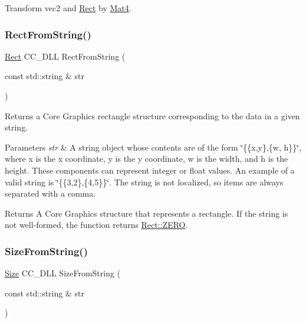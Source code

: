 Transform vec2 and \hyperlink{classRect}{Rect} by \hyperlink{classMat4}{Mat4}. \mbox{\label{group__base_gada35ca7274b8913c2341dbe8c78300bb}} 
\subsubsection{\texorpdfstring{Rect\+From\+String()}{RectFromString()}}
{\footnotesize\ttfamily \hyperlink{classRect}{Rect} C\+C\+\_\+\+D\+LL Rect\+From\+String (\begin{DoxyParamCaption}\item[{const std\+::string \&}]{str }\end{DoxyParamCaption})}



Returns a Core Graphics rectangle structure corresponding to the data in a given string. 


\begin{DoxyParams}{Parameters}
{\em str} & A string object whose contents are of the form \char`\"{}\{\{x,y\},\{w, h\}\}\char`\"{}, where x is the x coordinate, y is the y coordinate, w is the width, and h is the height. These components can represent integer or float values. An example of a valid string is \char`\"{}\{\{3,2\},\{4,5\}\}\char`\"{}. The string is not localized, so items are always separated with a comma. \\
\hline
\end{DoxyParams}
\begin{DoxyReturn}{Returns}
A Core Graphics structure that represents a rectangle. If the string is not well-\/formed, the function returns \hyperlink{classRect_a590be46e60027b2ca0f62a457f91a83e}{Rect\+::\+Z\+E\+RO}. 
\end{DoxyReturn}
\mbox{\label{group__base_gaac2ed1c93abba93b0631f2a1c7167e39}} 
\subsubsection{\texorpdfstring{Size\+From\+String()}{SizeFromString()}}
{\footnotesize\ttfamily \hyperlink{classSize}{Size} C\+C\+\_\+\+D\+LL Size\+From\+String (\begin{DoxyParamCaption}\item[{const std\+::string \&}]{str }\end{DoxyParamCaption})}



